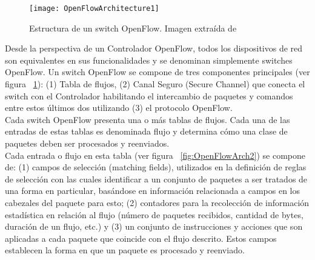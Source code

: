 
\begin{figure}[htbp!] 
\centering    
\texttt{[image: OpenFlowArchitecture1]}
\caption[Estructura de un switch OpenFlow]{Estructura de un switch OpenFlow. Imagen extraída de \cite{mckeown2008openflow}}
\label{fig:OpenFlowArch}
\end{figure}

Desde la perspectiva de un Controlador OpenFlow, todos los dispositivos de red son equivalentes en sus funcionalidades y se denominan simplemente switches OpenFlow. Un switch OpenFlow se compone de tres componentes principales (ver figura ~\ref{fig:OpenFlowArch}): (1) Tabla de flujos, (2) Canal Seguro 
 (Secure Channel) que conecta el switch con el Controlador habilitando el intercambio de paquetes y comandos entre estos últimos dos utilizando (3) el protocolo OpenFlow.\\
 
Cada switch OpenFlow presenta una o m\'as tablas de flujos. Cada una de las entradas de estas tablas es denominada flujo y determina c\'omo una clase de paquetes deben ser procesados y reenviados.\\

Cada entrada o flujo en esta tabla (ver figura ~\ref{fig:OpenFlowArch2}) se compone de: (1) campos de selección (matching fields), utilizados en la definici\'on de reglas de selección con las cuales identificar a un conjunto de paquetes a ser tratados de una forma en particular, basándose en información relacionada a campos en los cabezales del paquete para esto; (2) contadores para la recolección de información estadística en relación al flujo (n\'umero de paquetes recibidos, cantidad de bytes, duración de un flujo, etc.) y (3) un conjunto de instrucciones y acciones que son aplicadas a cada paquete que coincide con el flujo descrito. Estos campos establecen la forma en que un paquete es procesado y reenviado.
 
